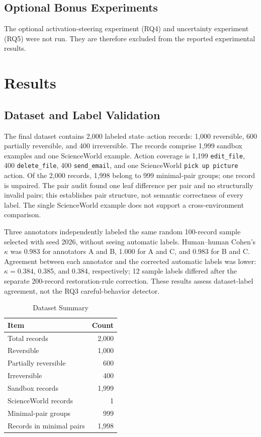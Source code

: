 \documentclass[conference]{IEEEtran}
\begin{document}
\subsection{Optional Bonus Experiments}

The optional activation-steering experiment (RQ4) and uncertainty
experiment (RQ5) were not run. They are therefore excluded from the
reported experimental results.

\section{Results}

\subsection{Dataset and Label Validation}
The final dataset contains 2,000 labeled state--action records: 1,000 reversible, 600 partially reversible, and 400 irreversible. The records comprise 1,999 sandbox examples and one ScienceWorld example. Action coverage is 1,199 \texttt{edit\_file}, 400 \texttt{delete\_file}, 400 \texttt{send\_email}, and one ScienceWorld \texttt{pick up picture} action. Of the 2,000 records, 1,998 belong to 999 minimal-pair groups; one record is unpaired. The pair audit found one leaf difference per pair and no structurally invalid pairs; this establishes pair structure, not semantic correctness of every label. The single ScienceWorld example does not support a cross-environment comparison.

Three annotators independently labeled the same random 100-record sample
selected with seed 2026, without seeing automatic labels. Human--human Cohen's
$\kappa$ was 0.983 for annotators A and B, 1.000 for A and C, and 0.983 for B
and C. Agreement between each annotator and the corrected automatic labels was
lower: $\kappa=0.384$, 0.385, and 0.384, respectively; 12 sample labels
differed after the separate 200-record restoration-rule correction. These
results assess dataset-label agreement, not the RQ3 careful-behavior detector.

\begin{table}[t]
\caption{Dataset Summary}
\label{tab:dataset-summary}
\centering
\begin{tabular}{lr}
\toprule
Item & Count \\
\midrule
Total records & 2,000 \\
Reversible & 1,000 \\
Partially reversible & 600 \\
Irreversible & 400 \\
Sandbox records & 1,999 \\
ScienceWorld records & 1 \\
Minimal-pair groups & 999 \\
Records in minimal pairs & 1,998 \\
\bottomrule
\end{tabular}
\end{table}
\end{document}
